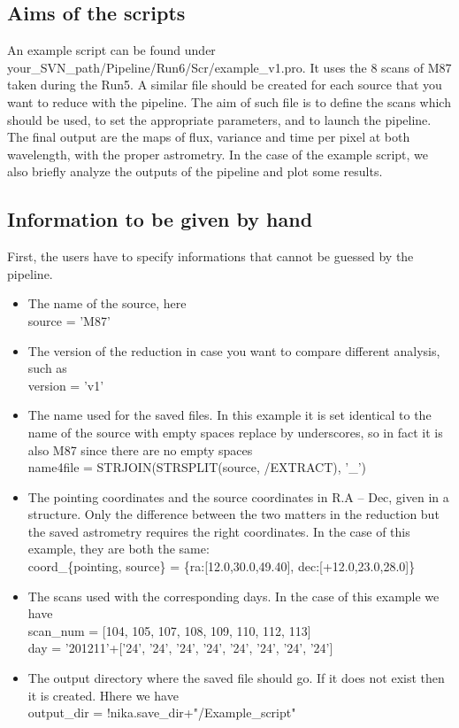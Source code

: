\documentclass[a4paper]{article}
\begin{document}
\subsection{Aims of the scripts}
An example script can be found under {\color{blue} your\_SVN\_path/Pipeline/Run6/Scr/example\_v1.pro}. It uses the 8 scans of M87 taken during the Run5. A similar file should be created for each source that you want to reduce with the pipeline. The aim of such file is to define the scans which should be used, to set the appropriate parameters, and to launch the pipeline. The final output are the maps of flux, variance and time per pixel at both wavelength, with the proper astrometry. In the case of the example script, we also briefly analyze the outputs of the pipeline and plot some results.

\subsection{Information to be given by hand}
\label{sec:info_hand}
First, the users have to specify informations that cannot be guessed by the pipeline.
\begin{itemize}
\item The name of the source, here \\
{\color{blue} source = 'M87'}
\item The version of the reduction in case you want to compare different analysis, such as \\
{\color{blue} version = 'v1'}
\item The name used for the saved files. In this example it is set identical to the name of the source with empty spaces replace by underscores, so in fact it is also M87 since there are no empty spaces\\
{\color{blue} name4file = STRJOIN(STRSPLIT(source, /EXTRACT), '\_')}
\item The pointing coordinates and the source coordinates in R.A -- Dec, given in a structure. Only the difference between the two matters in the reduction but the saved astrometry requires the right coordinates. In the case of this example, they are both the same: \\
{\color{blue} coord\_\{pointing, source\} = \{ra:[12.0,30.0,49.40], dec:[+12.0,23.0,28.0]\}}
\item The scans used with the corresponding days. In the case of this example we have \\
{\color{blue} scan\_num = [104, 105, 107, 108, 109, 110, 112, 113]}\\
{\color{blue} day = '201211'+['24', '24', '24', '24', '24', '24', '24', '24']}
\item The output directory where the saved file should go. If it does not exist then it is created. Hhere we have \\
{\color{blue} output\_dir = !nika.save\_dir+"/Example\_script"}
\end{itemize}
\end{document}
